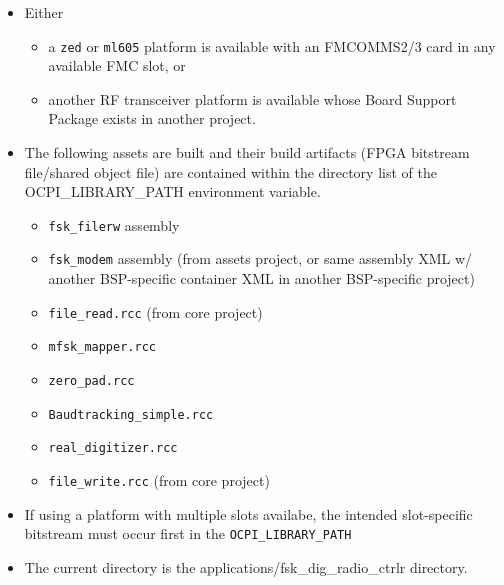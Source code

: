     \begin{itemize}
      \item Either
        \begin{itemize}
          \item a \verb+zed+ or \verb+ml605+ platform is available with an
            FMCOMMS2/3 card in any available FMC slot, or
          \item another RF transceiver platform is available whose Board Support
            Package exists in
            another project.
        \end{itemize}
      \item The following assets are built and their build artifacts (FPGA
        bitstream file/shared object file) are contained within the directory
        list
        of the OCPI\_LIBRARY\_PATH environment variable.
      \begin{itemize}
        \item \verb+fsk_filerw+ assembly
        \item \verb+fsk_modem+ assembly (from assets project, or same assembly XML
          w/ another
          BSP-specific container XML in another
          BSP-specific project)
        \item \verb+file_read.rcc+ (from core project)
        \item \verb+mfsk_mapper.rcc+
        \item \verb+zero_pad.rcc+
        \item \verb+Baudtracking_simple.rcc+
        \item \verb+real_digitizer.rcc+
        \item \verb+file_write.rcc+ (from core project)
      \end{itemize}
    \item If using a platform with multiple slots availabe, the intended
      slot-specific bitstream must occur first in the
      \texttt{OCPI\_LIBRARY\_PATH}
    \item The current directory is the applications/fsk\_dig\_radio\_ctrlr directory.
    \end{itemize}

